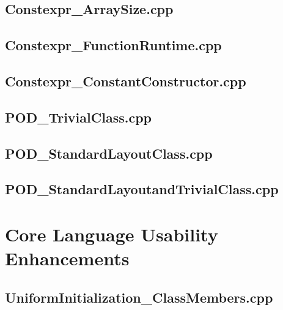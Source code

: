 \documentclass[11pt]{report}
\newcommand{\Cpp}{\lstset{language=C++,keywordstyle=\bfseries,breaklines,breakindent=30pt}}
\begin{document}
\begin{appendix}
\subsection{Constexpr\_ArraySize.cpp}
\label{Constexpr_ArraySize}


\subsection{Constexpr\_FunctionRuntime.cpp}
\label{Constexpr_FunctionRuntime}


\subsection{Constexpr\_ConstantConstructor.cpp}
\label{Constexpr_ConstantConstructor}


\subsection{POD\_TrivialClass.cpp}
\label{POD_TrivialClass}


\subsection{POD\_StandardLayoutClass.cpp}
\label{POD_StandardLayoutClass}


\subsection{POD\_StandardLayoutandTrivialClass.cpp}
\label{POD_StandardLayoutandTrivialClass}


\section{Core Language Usability Enhancements}
\label{Appendix: corelanguage usabiliy enhancements}

\Cpp

\subsection{UniformInitialization\_ClassMembers.cpp}
\label{UniformInitialization_ClassMembers}



\end{appendix}
\end{document}
